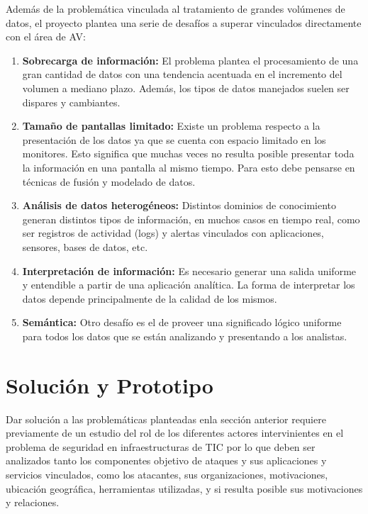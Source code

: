 \documentclass[a4paper]{./plantillas/llncs}
\begin{document}
Además de la problemática vinculada al tratamiento de grandes volúmenes de datos, el proyecto plantea una serie de desafíos a superar vinculados directamente con el área de AV:

\begin{enumerate}
\item {\bfseries Sobrecarga de información:} El problema plantea el procesamiento de una gran cantidad de datos con una tendencia acentuada en el incremento del volumen a mediano plazo. Además, los tipos de datos manejados suelen ser dispares y cambiantes. 
\item {\bfseries Tamaño de pantallas limitado:} Existe un problema respecto a la presentación de los datos ya que se cuenta con espacio limitado en los monitores. Esto significa que muchas veces no resulta posible presentar toda la información en una pantalla al mismo tiempo. Para esto debe pensarse en técnicas de fusión y modelado de datos. 
\item {\bfseries Análisis de datos heterogéneos:} Distintos dominios de conocimiento generan distintos tipos de información, en muchos casos en tiempo real, como ser registros de actividad (logs) y alertas vinculados con aplicaciones, sensores, bases de datos, etc. 
\item {\bfseries Interpretación de información:} Es necesario generar una salida uniforme y entendible a partir de una aplicación analítica. La forma de interpretar los datos depende principalmente de la calidad de los mismos.
\item {\bfseries Semántica:} Otro desafío es el de proveer una significado lógico uniforme para todos los datos que se están analizando y presentando a los analistas.
\end{enumerate}



\section{Solución y Prototipo}

Dar solución a las problemáticas planteadas enla sección anterior requiere previamente de un estudio del rol de los diferentes actores intervinientes en el problema de seguridad en infraestructuras de TIC por lo que deben ser analizados tanto los componentes objetivo de ataques y sus aplicaciones y servicios vinculados, como los atacantes, sus organizaciones, motivaciones, ubicación geográfica, herramientas utilizadas, y si resulta posible sus motivaciones y relaciones.
\end{document}
